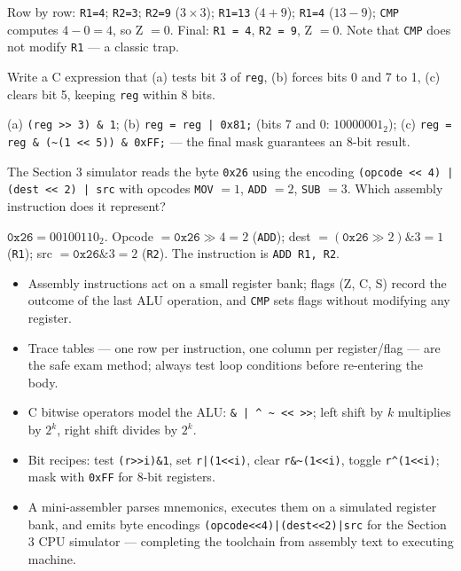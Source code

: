 \documentclass[11pt]{article}
\begin{document}
\begin{corrige}[Exercise 1]
Row by row: \texttt{R1=4}; \texttt{R2=3}; \texttt{R2=9} ($3\times3$); \texttt{R1=13} ($4+9$); \texttt{R1=4} ($13-9$); \texttt{CMP} computes $4-0=4$, so Z $= 0$. Final: \texttt{R1 = 4}, \texttt{R2 = 9}, Z $= 0$. Note that \texttt{CMP} does not modify \texttt{R1} — a classic trap.
\end{corrige}

\begin{exercice}
Write a C expression that (a) tests bit 3 of \texttt{reg}, (b) forces bits 0 and 7 to 1, (c) clears bit 5, keeping \texttt{reg} within 8 bits.
\end{exercice}

\begin{corrige}[Exercise 2]
(a) \texttt{(reg >> 3) \& 1}; (b) \texttt{reg = reg | 0x81;} (bits 7 and 0: $10000001_2$); (c) \texttt{reg = reg \& (\textasciitilde(1 << 5)) \& 0xFF;} — the final mask guarantees an 8-bit result.
\end{corrige}

\begin{exercice}
The Section 3 simulator reads the byte \texttt{0x26} using the encoding \texttt{(opcode << 4) | (dest << 2) | src} with opcodes \texttt{MOV} $= 1$, \texttt{ADD} $= 2$, \texttt{SUB} $= 3$. Which assembly instruction does it represent?
\end{exercice}

\begin{corrige}[Exercise 3]
$\texttt{0x26} = 00100110_2$. Opcode $= \texttt{0x26} \gg 4 = 2$ (\texttt{ADD}); dest $= (\texttt{0x26} \gg 2) \mathbin{\&} 3 = 1$ (\texttt{R1}); src $= \texttt{0x26} \mathbin{\&} 3 = 2$ (\texttt{R2}). The instruction is \texttt{ADD R1, R2}.
\end{corrige}

\begin{aretenir}
\begin{itemize}
\item Assembly instructions act on a small register bank; flags (Z, C, S) record the outcome of the last ALU operation, and \texttt{CMP} sets flags without modifying any register.
\item Trace tables — one row per instruction, one column per register/flag — are the safe exam method; always test loop conditions before re-entering the body.
\item C bitwise operators model the ALU: \texttt{\& | \^{} \textasciitilde{} << >>}; left shift by $k$ multiplies by $2^{k}$, right shift divides by $2^{k}$.
\item Bit recipes: test \texttt{(r>>i)\&1}, set \texttt{r|(1<<i)}, clear \texttt{r\&\textasciitilde(1<<i)}, toggle \texttt{r\^{}(1<<i)}; mask with \texttt{0xFF} for 8-bit registers.
\item A mini-assembler parses mnemonics, executes them on a simulated register bank, and emits byte encodings \texttt{(opcode<<4)|(dest<<2)|src} for the Section 3 CPU simulator — completing the toolchain from assembly text to executing machine.
\end{itemize}
\end{aretenir}
\end{document}
